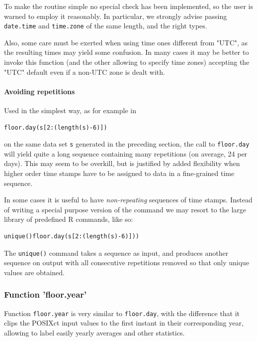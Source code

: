 \documentclass[a4paper,10pt]{book}
\begin{document}
To make the routine simple no special check has been implemented, so the user is warned to employ it reasonably. In particular, we strongly advise passing \verb|date.time| and \verb|time.zone| of the same length, and the right types.

Also, some care must be exerted when using time ones different from "UTC", as the resulting times may yield some confusion. In many cases it may be better to invoke this function (and the other allowing to specify time zones) accepting the "UTC" default even if a non-UTC zone is dealt with.

\paragraph{Avoiding repetitions}

Used in the simplest way, as for example in

\begin{verbatim}
floor.day(s[2:(length(s)-6)])
\end{verbatim}

\noindent on the same data set \verb|s| generated in the preceding section, the call to \verb|floor.day| will yield quite a long sequence containing many repetitions (on average, 24 per days). This may seem to be overkill, but is justified by added flexibility when higher order time stamps have to be assigned to data in a fine-grained time sequence.

In some cases it is useful to have \emph{non-repeating} sequences of time stamps. Instead of writing a special purpose version of the command we may resort to the large library of predefined R commands, like so:

\begin{verbatim}
unique()floor.day(s[2:(length(s)-6)]))
\end{verbatim}

The \verb|unique()| command takes a sequence as input, and produces another sequence on output with all consecutive repetitions removed so that only unique values are obtained.


\subsubsection{Function 'floor.year'}

Function \verb|floor.year| is very similar to \verb|floor.day|, with the difference that it clips the POSIXct input values to the first instant in their corresponding year, allowing to label easily yearly averages and other statistics.
\end{document}
